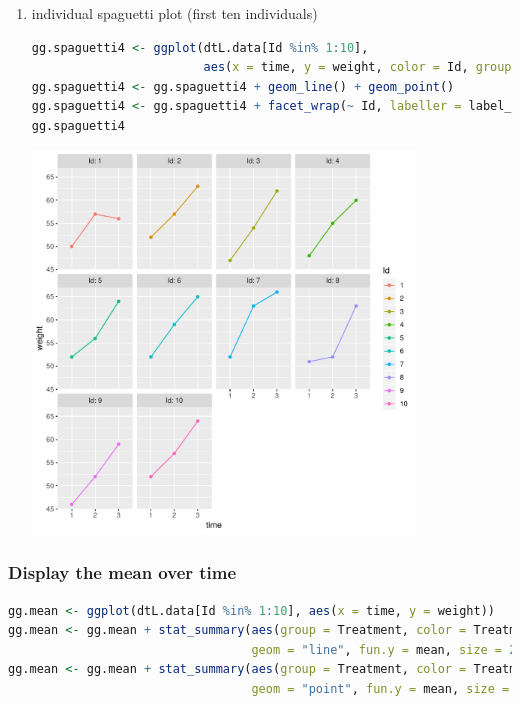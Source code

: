 \documentclass{article}
\begin{document}
\begin{enumerate}
\clearpage
\item individual spaguetti plot (first ten individuals)
\label{sec:org34cad46}

\begin{lstlisting}[language=r,numbers=none]
gg.spaguetti4 <- ggplot(dtL.data[Id %in% 1:10], 
                        aes(x = time, y = weight, color = Id, group = Id))
gg.spaguetti4 <- gg.spaguetti4 + geom_line() + geom_point()
gg.spaguetti4 <- gg.spaguetti4 + facet_wrap(~ Id, labeller = label_both) 
gg.spaguetti4
\end{lstlisting}

\begin{center}
\includegraphics[width=0.8\textwidth]{./figures/fig-spaguetti4.pdf}
\end{center}

\clearpage
\end{enumerate}
\subsubsection{Display the mean over time}
\label{sec:orgf9a06f6}

\begin{lstlisting}[language=r,numbers=none]
gg.mean <- ggplot(dtL.data[Id %in% 1:10], aes(x = time, y = weight))
gg.mean <- gg.mean + stat_summary(aes(group = Treatment, color = Treatment), 
                                  geom = "line", fun.y = mean, size = 2)
gg.mean <- gg.mean + stat_summary(aes(group = Treatment, color = Treatment), 
                                  geom = "point", fun.y = mean, size = 3)
\end{lstlisting}
\end{document}
